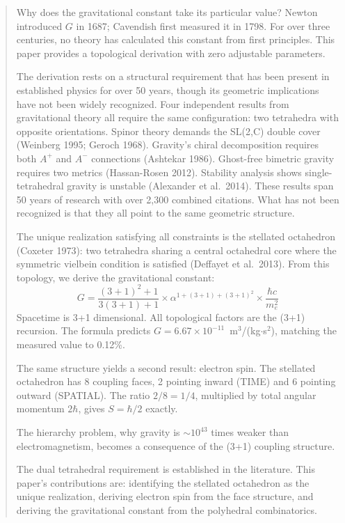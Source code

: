 \documentclass[aps,prd,preprint,superscriptaddress,showpacs,preprintnumbers,amsmath,amssymb,nofootinbib]{revtex4-2}
\begin{document}
\begin{abstract}
Why does the gravitational constant take its particular value? Newton introduced $G$ in 1687; Cavendish first measured it in 1798. For over three centuries, no theory has calculated this constant from first principles. This paper provides a topological derivation with zero adjustable parameters.

The derivation rests on a structural requirement that has been present in established physics for over 50 years, though its geometric implications have not been widely recognized. Four independent results from gravitational theory all require the same configuration: two tetrahedra with opposite orientations. Spinor theory demands the SL(2,C) double cover (Weinberg 1995; Geroch 1968). Gravity's chiral decomposition requires both $A^+$ and $A^-$ connections (Ashtekar 1986). Ghost-free bimetric gravity requires two metrics (Hassan-Rosen 2012). Stability analysis shows single-tetrahedral gravity is unstable (Alexander et al.\ 2014). These results span 50 years of research with over 2,300 combined citations. What has not been recognized is that they all point to the same geometric structure.

The unique realization satisfying all constraints is the stellated octahedron (Coxeter 1973): two tetrahedra sharing a central octahedral core where the symmetric vielbein condition is satisfied (Deffayet et al.\ 2013). From this topology, we derive the gravitational constant:
\[
G = \frac{(3+1)^2 + 1}{3(3+1) + 1} \times \alpha^{1+(3+1)+(3+1)^2} \times \frac{\hbar c}{m_e^2}
\]
Spacetime is 3+1 dimensional. All topological factors are the (3+1) recursion. The formula predicts $G = 6.67 \times 10^{-11}$~m$^3$/(kg$\cdot$s$^2$), matching the measured value to 0.12\%.

The same structure yields a second result: electron spin. The stellated octahedron has 8 coupling faces, 2 pointing inward (TIME) and 6 pointing outward (SPATIAL). The ratio $2/8 = 1/4$, multiplied by total angular momentum $2\hbar$, gives $S = \hbar/2$ exactly.

The hierarchy problem, why gravity is $\sim 10^{43}$ times weaker than electromagnetism, becomes a consequence of the (3+1) coupling structure.

The dual tetrahedral requirement is established in the literature. This paper's contributions are: identifying the stellated octahedron as the unique realization, deriving electron spin from the face structure, and deriving the gravitational constant from the polyhedral combinatorics.
\end{abstract}
\end{document}
